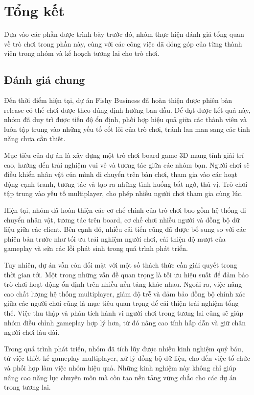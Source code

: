 \section{Tổng kết}
Dựa vào các phần được trình bày trước đó, nhóm thực hiện đánh giá tổng quan về trò chơi trong phần này, cùng với các công việc đã đóng góp của từng thành viên trong nhóm và kế hoạch tương lai cho trò chơi.
\subsection{Đánh giá chung}
Đến thời điểm hiện tại, dự án Fishy Business đã hoàn thiện được phiên bản release có thể chơi được theo đúng định hướng ban đầu. Để đạt được kết quả này, nhóm đã duy trì được tiến độ ổn định, phối hợp hiệu quả giữa các thành viên và luôn tập trung vào những yếu tố cốt lõi của trò chơi, tránh lan man sang các tính năng chưa cần thiết.

Mục tiêu của dự án là xây dựng một trò chơi board game 3D mang tính giải trí cao, hướng đến trải nghiệm vui vẻ và tương tác giữa các nhóm bạn. Người chơi sẽ điều khiển nhân vật của mình di chuyển trên bàn chơi, tham gia vào các hoạt động cạnh tranh, tương tác và tạo ra những tình huống bất ngờ, thú vị. Trò chơi tập trung vào yếu tố multiplayer, cho phép nhiều người chơi tham gia cùng lúc.

Hiện tại, nhóm đã hoàn thiện các cơ chế chính của trò chơi bao gồm hệ thống di chuyển nhân vật, tương tác trên board, cơ chế chơi nhiều người và đồng bộ dữ liệu giữa các client. Bên cạnh đó, nhiều cải tiến cũng đã được bổ sung so với các phiên bản trước như tối ưu trải nghiệm người chơi, cải thiện độ mượt của gameplay và sửa các lỗi phát sinh trong quá trình phát triển.

Tuy nhiên, dự án vẫn còn đối mặt với một số thách thức cần giải quyết trong thời gian tới. Một trong những vấn đề quan trọng là tối ưu hiệu suất để đảm bảo trò chơi hoạt động ổn định trên nhiều nền tảng khác nhau. Ngoài ra, việc nâng cao chất lượng hệ thống multiplayer, giảm độ trễ và đảm bảo đồng bộ chính xác giữa các người chơi cũng là mục tiêu quan trọng để cải thiện trải nghiệm tổng thể. Việc thu thập và phân tích hành vi người chơi trong tương lai cũng sẽ giúp nhóm điều chỉnh gameplay hợp lý hơn, từ đó nâng cao tính hấp dẫn và giữ chân người chơi lâu dài.

Trong quá trình phát triển, nhóm đã tích lũy được nhiều kinh nghiệm quý báu, từ việc thiết kế gameplay multiplayer, xử lý đồng bộ dữ liệu, cho đến việc tổ chức và phối hợp làm việc nhóm hiệu quả. Những kinh nghiệm này không chỉ giúp nâng cao năng lực chuyên môn mà còn tạo nền tảng vững chắc cho các dự án trong tương lai.

